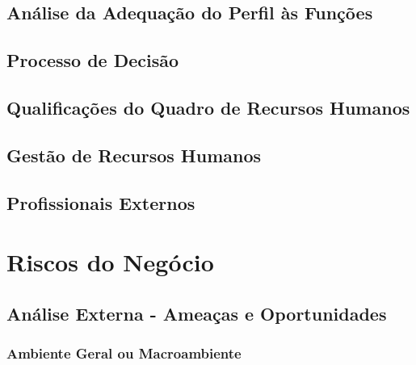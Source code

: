 \documentclass[11pt]{article}
\begin{document}
	\normalsize
	
	
	\large
	\subsection{Análise da Adequação do Perfil às Funções}
	
	\normalsize
	
	
	\large
	\subsection{Processo de Decisão}
	
	\normalsize
	
	
	\large
	\subsection{Qualificações do Quadro de Recursos Humanos}
	
	\normalsize
	
	
	\large
	\subsection{Gestão de Recursos Humanos}
	
	\normalsize
	
	
	\large
	\subsection{Profissionais Externos}
	
	\normalsize
	
	\pagebreak
	
	\large
	\section{Riscos do Negócio}
	
	\normalsize
	
	
	\large
	\subsection{Análise Externa - Ameaças e Oportunidades}
	
	\normalsize
	
	
	\large
	\subsubsection{Ambiente Geral ou Macroambiente}
	
	\normalsize
	
\end{document}
